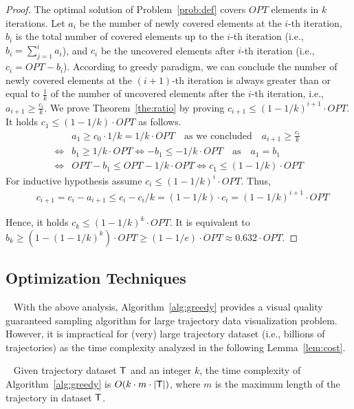 \begin{proof}
The optimal solution of Problem~\ref{prob:def} covers $OPT$ elements in $k$ iterations.
Let $a_i$ be the number of newly covered elements at the $i$-th iteration, $b_i$ is the total number of covered elements up to the $i$-th iteration (i.e., $b_i = \sum_{j=1}^{i}a_i$),
and $c_i$ be the uncovered elements after $i$-th iteration (i.e., $c_i = OPT-b_i$). 
According to greedy paradigm, we can conclude the number of newly covered elements at the $(i+1)$-th iteration is always greater than or equal to $\frac{1}{k}$ of the number of uncovered elements after the $i$-th iteration, i.e., $a_{i+1} \geq \frac{c_i}{k}$.
We prove Theorem~\ref{the:ratio} by proving $c_{i+1} \leq (1-1/k)^{i+1} \cdot OPT$.
It holds $c_1 \leq (1-1/k) \cdot OPT$ as follows.
\begin{align} \nonumber
& a_1 \geq c_0 \cdot 1/k = 1/k \cdot OPT \text{~~~as we concluded~~~} a_{i+1} \geq \frac{c_i}{k}\\ \nonumber
 \Leftrightarrow  & b_1 \geq 1/k \cdot OPT  \Leftrightarrow  -b_1 \leq - 1/k \cdot OPT  \text{~~~as~~~} a_1 = b_1\\ \nonumber
 \Leftrightarrow & OPT - b_ 1 \leq OPT - 1/k \cdot OPT  \Leftrightarrow  c_1 \leq (1-1/k) \cdot OPT 
\end{align}
For inductive hypothesis assume $c_{i} \leq (1-1/k)^i \cdot OPT$. Thus,
\begin{align} \nonumber
& c_{i+1} = c_i - a_{i+1} \leq c_i - c_i/k = (1-1/k) \cdot c_i = (1-1/k)^{i+1} \cdot OPT
\end{align}

Hence, it holds $c_k \leq (1-1/k)^{k} \cdot OPT$.
It is equivalent to $b_k \geq (1 - (1-1/k)^{k}) \cdot OPT \geq (1-1/e) \cdot OPT \approx 0.632 \cdot OPT$.
\end{proof}


\subsection{Optimization Techniques}~\label{sec:opt}
With the above analysis, Algorithm~\ref{alg:greedy} provides a visual quality guaranteed sampling algorithm for large trajectory data visualization problem.
However, it is impractical for (very) large trajectory dataset (i.e., billions of trajectories) as the time complexity analyzed in the following Lemma~\ref{lem:cost}.

\begin{lemma}~\label{lem:cost}
Given trajectory dataset $\mathsf{T}$ and an integer $k$, the time complexity of Algorithm~\ref{alg:greedy} is $O(k \cdot m \cdot |\mathsf{T}|)$, where $m$ is the maximum length of the trajectory in dataset $\mathsf{T}$.
\end{lemma}

